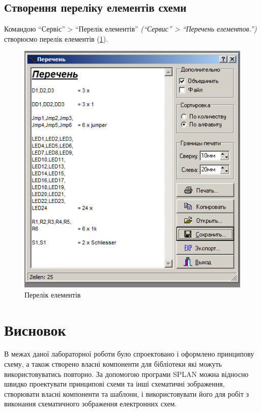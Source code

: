 \newpage
\NoBorder
\label{lab2:pdf:element_1}

\label{lab2:pdf:element_1_2}

\newpage
\BorderText


\subsection{Створення переліку  елементів схеми}

Командою ``Сервіс'' > ``Перелік елементів'' \textit{(``Сервис'' > ``Перечень елементов.'')}
створюємо перелік елементів (\ref{fig:lab2:elements_list}).
\begin{figure}[!htb]
  \centering \includegraphics[width=0.4\linewidth]{./images/lab2/elements_list.png}
  \caption{Перелік елементів}
  \label{fig:lab2:elements_list}
\end{figure}
\FloatBarrier

\pagebreak
\section*{Висновок}

В межах даної лабораторної роботи було спроектовано і оформлено принципову схему, а також створено
власні компоненти для бібліотеки які можуть використовуватись повторно.  За допомогою програми SPLAN
можна відносно швидко проектувати принципові схеми та інші схематичні зображення, створювати власні
компоненти та шаблони, і використовувати його для робіт з виконання схематичного зображення
електронних схем.
